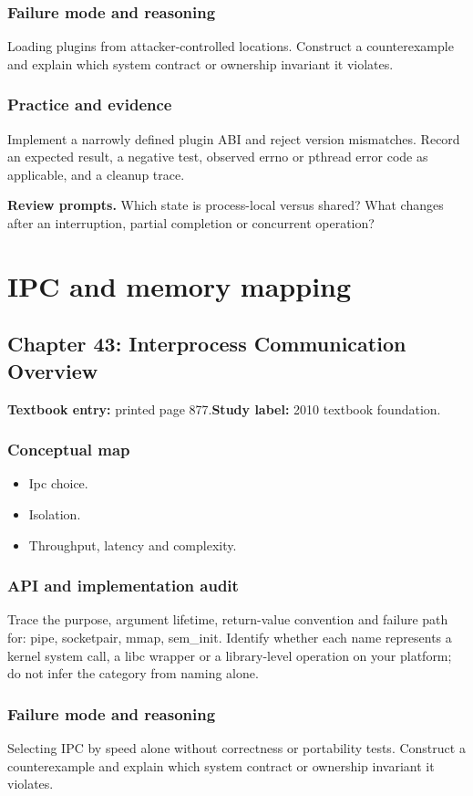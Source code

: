 \documentclass[11pt,letterpaper,oneside]{report}
\begin{document}
\subsection{Failure mode and reasoning}
Loading plugins from attacker-controlled locations. Construct a counterexample and explain which system contract or ownership invariant it violates.

\subsection{Practice and evidence}
Implement a narrowly defined plugin ABI and reject version mismatches. Record an expected result, a negative test, observed errno or pthread error code as applicable, and a cleanup trace.

\textbf{Review prompts.} Which state is process-local versus shared? What changes after an interruption, partial completion or concurrent operation?

\chapter{IPC and memory mapping}
\section{Chapter 43: Interprocess Communication Overview}
\textbf{Textbook entry:} printed page 877.\quad \textbf{Study label:} 2010 textbook foundation.

\subsection{Conceptual map}
\begin{itemize}
\item Ipc choice.
\item Isolation.
\item Throughput, latency and complexity.
\end{itemize}
\subsection{API and implementation audit}
Trace the purpose, argument lifetime, return-value convention and failure path for: pipe, socketpair, mmap, sem\_init. Identify whether each name represents a kernel system call, a libc wrapper or a library-level operation on your platform; do not infer the category from naming alone.

\subsection{Failure mode and reasoning}
Selecting IPC by speed alone without correctness or portability tests. Construct a counterexample and explain which system contract or ownership invariant it violates.
\end{document}
